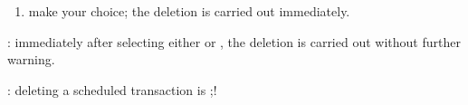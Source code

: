 \begin{enumerate}
\begin{itemize}
		\Attention{}: by ticking this box, future deletions will take place immediately, without warning and without a dialogue box.
		
		\Note{}: you can re-enable the display of the deletion dialogue box in Grisbi’s preferences; see the chapter \vref{setup-operations-remove} .
	\end{itemize}
	\item make your choice; the deletion is carried out immediately.
\end{enumerate}

\Attention{}: immediately after selecting either  or , the deletion is carried out without further warning.

\Attention{}: deleting a scheduled transaction is ;!
